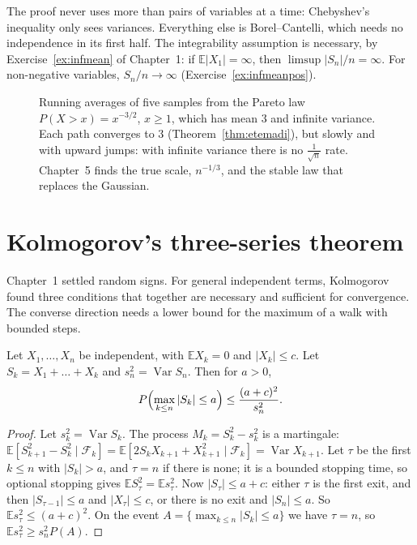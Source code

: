 The proof never uses more than pairs of variables at a time: Chebyshev's inequality only sees variances. Everything else is Borel--Cantelli,
which needs no independence in its first half. The integrability assumption is necessary, by Exercise~\ref{ex:infmean} of Chapter~1: if
$\mathbb E|X_1|=\infty$, then $\limsup|S_n|/n=\infty$. For non-negative variables, $S_n/n\to\infty$ (Exercise~\ref{ex:infmeanpos}).

\begin{figure}[ht]
\centering{}
\caption{Running averages of five samples from the Pareto law $P(X>x)=x^{-3/2}$, $x\ge1$, which has mean $3$ and infinite variance. Each path
converges to $3$ (Theorem~\ref{thm:etemadi}), but slowly and with upward jumps: with infinite variance there is no $\frac1{\sqrt n}$ rate.
Chapter~5 finds the true scale, $n^{-1/3}$, and the stable law that replaces the Gaussian.}
\label{fig:pareto}
\end{figure}

\section{Kolmogorov's three-series theorem}\label{sec:threeseries}

Chapter~1 settled random signs. For general independent terms, Kolmogorov found three conditions that together are necessary and sufficient
for convergence. The converse direction needs a lower bound for the maximum of a walk with bounded steps.

\begin{lemma}\label{lem:kolmogorovlower}
Let $X_1,\dots,X_n$ be independent, with $\mathbb E X_k=0$ and $|X_k|\le c$. Let $S_k=X_1+\dots+X_k$ and $s_n^2=\operatorname{Var}S_n$. Then for
$a>0$,
\[
P\Bigl(\max_{k\le n}|S_k|\le a\Bigr)\le\frac{(a+c)^2}{s_n^2}.
\]
\end{lemma}
\begin{proof}
Let $s_k^2=\operatorname{Var}S_k$. The process $M_k=S_k^2-s_k^2$ is a martingale: $\mathbb E[S_{k+1}^2-S_k^2\mid\mathcal F_k]=\mathbb E[2S_kX_{k+1}+X_{k+1}^2
\mid\mathcal F_k]=\operatorname{Var}X_{k+1}$. Let $\tau$ be the first $k\le n$ with $|S_k|>a$, and $\tau=n$ if there is none; it is a bounded
stopping time, so optional stopping gives $\mathbb E S_\tau^2=\mathbb E s_\tau^2$. Now $|S_\tau|\le a+c$: either $\tau$ is the first exit, and then
$|S_{\tau-1}|\le a$ and $|X_\tau|\le c$, or there is no exit and $|S_n|\le a$. So $\mathbb E s_\tau^2\le(a+c)^2$. On the event
$A=\{\max_{k\le n}|S_k|\le a\}$ we have $\tau=n$, so $\mathbb E s_\tau^2\ge s_n^2P(A)$.
\end{proof}

